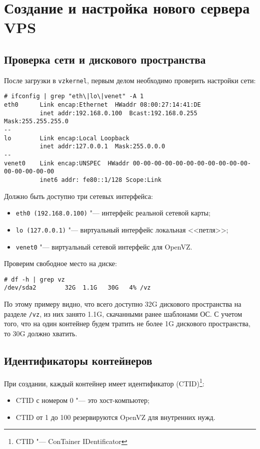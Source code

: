 \section{Создание и настройка нового сервера VPS}
\subsection{Проверка сети и дискового пространства}

После загрузки в \texttt{vzkernel}, первым делом необходимо проверить настройки сети:
\begin{lstlisting}
# ifconfig | grep "eth\|lo\|venet" -A 1
eth0      Link encap:Ethernet  HWaddr 08:00:27:14:41:DE  
          inet addr:192.168.0.100  Bcast:192.168.0.255  Mask:255.255.255.0
--
lo        Link encap:Local Loopback  
          inet addr:127.0.0.1  Mask:255.0.0.0
--
venet0    Link encap:UNSPEC  HWaddr 00-00-00-00-00-00-00-00-00-00-00-00-00-00-00-00  
          inet6 addr: fe80::1/128 Scope:Link
\end{lstlisting}

Должно быть доступно три сетевых интерфейса:
\begin{itemize}
    \item \texttt{eth0 (192.168.0.100)} "--- интерфейс реальной сетевой карты;
    \item \texttt{lo (127.0.0.1)} "--- виртуальный интерфейс локальная <<петля>>;
    \item \texttt{venet0} "--- виртуальный сетевой интерфейс для OpenVZ.
\end{itemize}

Проверим свободное место на диске:
\begin{lstlisting}
# df -h | grep vz
/dev/sda2        32G  1.1G   30G   4% /vz
\end{lstlisting}

По этому примеру видно, что всего доступно 32G дискового пространства на разделе \texttt{/vz}, из них занято 1.1G, скачанными ранее шаблонами ОС.
С учетом того, что на один контейнер будем тратить не более 1G дискового пространства, то 30G должно хватить.

\subsection{Идентификаторы контейнеров}
При создании, каждый контейнер имеет идентификатор (CTID)\footnote{CTID "--- ConTainer IDentificator}:
\begin{itemize}
    \item CTID с номером 0 "--- это хост-компьютер;
    \item CTID от 1 до 100 резервируются OpenVZ для внутренних нужд.
\end{itemize}

